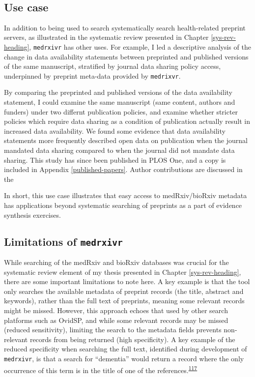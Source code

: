 \documentclass[a4paper, twoside]{templates/ociamthesis}
\begin{document}
~

\hypertarget{use-case}{%
\subsection{Use case}\label{use-case}}

In addition to being used to search systematically search health-related preprint servers, as illustrated in the systematic review presented in Chapter \ref{sys-rev-heading}, \texttt{medrxivr} has other uses. For example, I led a descriptive analysis of the change in data availability statements between preprinted and published versions of the same manuscript, stratified by journal data sharing policy access, underpinned by preprint meta-data provided by \texttt{medrixvr}.

By comparing the preprinted and published versions of the data availability statement, I could examine the same manuscript (same content, authors and funders) under two differnt publication policies, and examine whether stricter policies which require data sharing as a condition of publication actually result in increased data availability. We found some evidence that data availability statements more frequently described open data on publication when the journal mandated data sharing compared to when the journal did not mandate data sharing. This study has since been published in PLOS One, and a copy is included in Appendix \ref{published-papers}. Author contributions are discussed in the

In short, this use case illustrates that easy access to medRxiv/bioRxiv metadata has applications beyond systematic searching of preprints as a part of evidence synthesis exercises.

\hypertarget{medrxivr-limitations}{%
\subsection{\texorpdfstring{Limitations of \texttt{medrxivr}}{Limitations of medrxivr}}\label{medrxivr-limitations}}

While searching of the medRxiv and bioRxiv databases was crucial for the systematic review element of my thesis presented in Chapter \ref{sys-rev-heading}, there are some important limitations to note here. A key example is that the tool only searches the available metadata of preprint records (the title, abstract and keywords), rather than the full text of preprints, meaning some relevant records might be missed. However, this approach echoes that used by other search platforms such as OvidSP, and while some relevant records may be missed (reduced sensitivity), limiting the search to the metadata fields prevents non-relevant records from being returned (high specificity). A key example of the reduced specificity when searching the full text, identified during development of \texttt{medrxivr}, is that a search for ``dementia'' would return a record where the only occurrence of this term is in the title of one of the references.\textsuperscript{\protect\hyperlink{ref-bong2019}{117}}
\end{document}
